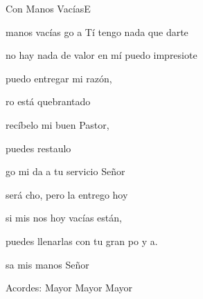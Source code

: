 \documentclass[12pt, spanish]{book}
\begin{document}
\begin{song}{Con Manos Vacías}{E}
        \begin{SBExtraKeys}{

            \begin{SBOpGroup}
                 manos vacías go a Tí  tengo nada que darte

                no hay nada de valor en mí  puedo impresiote
            \end{SBOpGroup}
            \vskip 20pt
            \begin{SBOpGroup}
                 puedo entregar mi razón,

                ro está quebrantado

                recíbelo mi buen Pastor,

                 puedes restaulo
            \end{SBOpGroup}

            \begin{SBChorus}
                go mi da a tu servicio Señor

                 será cho, pero la entrego hoy

                 si mis nos hoy vacías están,

                puedes llenarlas con tu gran po y a.

                sa mis manos Señor
            \end{SBChorus}

            \ifChordBk
            \begin{SBOpGroup}
                Acordes:
                 Mayor \hfill
                 Mayor \hfill\null\break
                 Mayor \hfill
            \end{SBOpGroup}
            \fi
        }\end{SBExtraKeys}
    \end{song}
\end{document}
